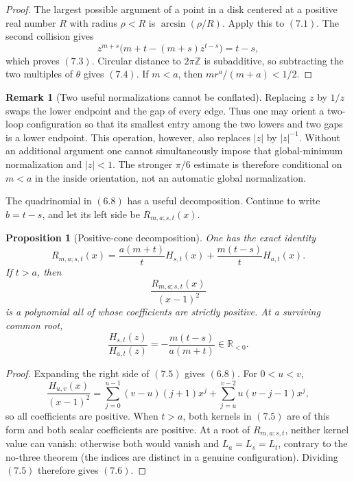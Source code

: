 \documentclass[11pt]{article}
\newtheorem{proposition}[theorem]{Proposition}
\theoremstyle{definition}
\newtheorem{remark}[theorem]{Remark}
\newcommand{\Z}{\mathbb Z}
\begin{document}
\begin{proof}
The largest possible argument of a point in a disk centered at a positive real
number \(R\) with radius \(\rho<R\) is
\(\arcsin(\rho/R)\).  Apply this to \((7.1)\).  The second collision gives
\[
 z^{m+s}\bigl(m+t-(m+s)z^{t-s}\bigr)=t-s,
\]
which proves \((7.3)\).  Circular distance to \(2\pi\Z\) is subadditive,
so subtracting the two multiples of \(\theta\) gives \((7.4)\).  If
\(m<a\), then \(mr^a/(m+a)<1/2\).
\end{proof}

\begin{remark}[Two useful normalizations cannot be conflated]
Replacing \(z\) by \(1/z\) swaps the lower endpoint and the gap of every
edge.  Thus one may orient a two-loop configuration so that its smallest
entry among the two lowers and two gaps is a lower endpoint.  This operation,
however, also replaces \(|z|\) by \(|z|^{-1}\).  Without an additional
argument one cannot simultaneously impose that global-minimum normalization
and \(|z|<1\).  The stronger \(\pi/6\) estimate is therefore conditional on
\(m<a\) in the inside orientation, not an automatic global normalization.
\end{remark}

The quadrinomial in \((6.8)\) has a useful decomposition.  Continue to write
\(b=t-s\), and let its left side be \(R_{m,a;s,t}(x)\).

\begin{proposition}[Positive-cone decomposition]\label{prop:positivecone}
One has the exact identity
\begin{equation}
 R_{m,a;s,t}(x)=
 \frac{a(m+t)}{t}H_{s,t}(x)
 +\frac{m(t-s)}{t}H_{a,t}(x).
 \tag{7.5}
\end{equation}
If \(t>a\), then
\[
 \frac{R_{m,a;s,t}(x)}{(x-1)^2}
\]
is a polynomial all of whose coefficients are strictly positive.  At a
surviving common root,
\begin{equation}
 \frac{H_{s,t}(z)}{H_{a,t}(z)}
 =-\frac{m(t-s)}{a(m+t)}\in\mathbb R_{<0}.
 \tag{7.6}
\end{equation}
\end{proposition}

\begin{proof}
Expanding the right side of \((7.5)\) gives \((6.8)\).  For \(0<u<v\),
\begin{equation}
 \frac{H_{u,v}(x)}{(x-1)^2}
 =\sum_{j=0}^{u-1}(v-u)(j+1)x^j
  +\sum_{j=u}^{v-2}u(v-j-1)x^j,
 \tag{7.7}
\end{equation}
so all coefficients are positive.  When \(t>a\), both kernels in
\((7.5)\) are of this form and both scalar coefficients are positive.
At a root of \(R_{m,a;s,t}\), neither kernel value can vanish:
otherwise both would vanish and \(L_a=L_s=L_t\), contrary to the
no-three theorem (the indices are distinct in a genuine configuration).
Dividing \((7.5)\) therefore gives \((7.6)\).
\end{proof}
\end{document}
